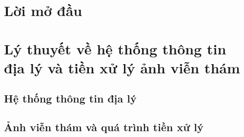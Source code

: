 \documentclass[a4paper, 12pt]{report}
\begin{document}
\chapter*{Lời mở đầu}


\chapter{Lý thuyết về hệ thống thông tin địa lý và tiền xử lý ảnh viễn thám}

\section{Hệ thống thông tin địa lý}

\section{Ảnh viễn thám và quá trình tiền xử lý}
\end{document}
